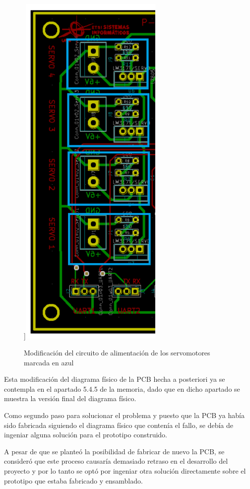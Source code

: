 \begin{itemize}
\begin{figure}[H]
    \cite{MotorCorrienteContinua2020}]{\includegraphics[width=69mm]{pictures/POSFIX.png}}
    \caption{Modificación del circuito de alimentación de los servomotores marcada en azul }
    \label{fig:lego}
    \end{figure}
    
    Esta modificación del diagrama físico de la \ac{PCB} hecha a posteriori ya se contempla en el apartado 5.4.5 de la memoria, dado que en dicho apartado se muestra la versión final del diagrama físico.
    
    Como segundo paso para solucionar el problema y puesto que la \ac{PCB} ya había sido fabricada siguiendo el diagrama físico que contenía el fallo, se debía de ingeniar alguna solución para el prototipo construido. 
    
    A pesar de que se planteó la posibilidad de fabricar de nuevo la \ac{PCB}, se consideró que este proceso causaría demasiado retraso en el desarrollo del proyecto y por lo tanto se optó por ingeniar otra solución directamente sobre el prototipo que estaba fabricado y ensamblado.
    

\end{itemize}
